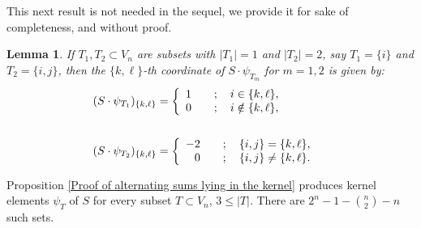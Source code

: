 \documentclass[12pt]{amsart}
\numberwithin{theorem}{section}
\newtheorem{lemma}[theorem]{Lemma}
\theoremstyle{remark}
\begin{document}
This next result is not needed in the sequel, we provide it for sake of completeness, and without proof.  
\begin{lemma}
If $T_1, T_2\subset V_n$ are subsets with $|T_1|=1$ and $|T_2|=2$, say $T_1=\{i\}$ and $T_2=\{i,j\}$, then the $\{k,\ell\}$-th coordinate of $S\cdot \psi_{T_m}$ for $m=1,2$ is given by:
\begin{align*}
(S\cdot \psi_{T_1})_{\{k,\ell\}} & = \left\{ 
\begin{array}{cl}
1 & \quad ; \quad i\in \{k,\ell\}, \cr 
0 &  \quad ; \quad i\notin \{k,\ell\},
\end{array} 
\right. \cr
& \cr 
(S\cdot \psi_{T_2})_{\{k,\ell\}} & = \left\{ 
\begin{array}{rl}
-2 & \quad ; \quad \{i,j\} = \{k,\ell\}, \cr 
0 &  \quad ; \quad \{i,j\} \ne \{k,\ell\}.
\end{array} 
\right.
\end{align*} 
\end{lemma}
Proposition \ref{Proof of alternating sums lying in the kernel} produces kernel elements $\psi_T$ of $S$ for every subset $T\subset V_n$, $3\le |T|$. There are $2^n-1-{n\choose 2}-n$ such sets. 
\end{document}
